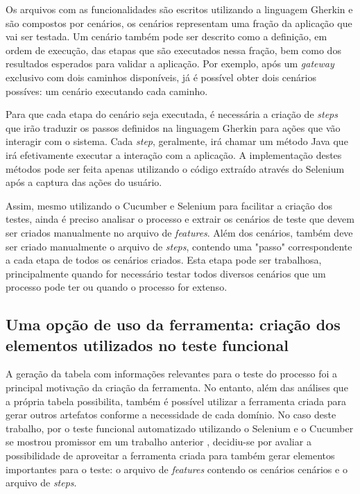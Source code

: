 \documentclass[12pt]{article}
\begin{document}
Os arquivos com as funcionalidades são escritos utilizando a linguagem Gherkin\cite{gherkin} e são compostos por cenários, os cenários representam uma fração da aplicação que vai ser testada. Um cenário também pode ser descrito como a definição, em ordem de execução, das etapas que são executados nessa fração, bem como dos resultados esperados para validar a aplicação. Por exemplo, após um \emph{gateway} exclusivo com dois caminhos disponíveis, já é possível obter dois cenários possíves: um cenário executando cada caminho.

Para que cada etapa do cenário seja executada, é necessária a criação de \emph{steps} que irão traduzir os passos definidos na linguagem Gherkin para ações que vão interagir com o sistema. Cada \emph{step}, geralmente, irá chamar um método Java que irá efetivamente executar a interação com a aplicação. A implementação destes métodos pode ser feita apenas utilizando o código extraído através do Selenium após a captura das ações do usuário.

Assim, mesmo utilizando o Cucumber e Selenium para facilitar a criação dos testes, ainda é preciso analisar o processo e extrair os cenários de teste que devem ser criados manualmente no arquivo de \emph{features}. Além dos cenários, também deve ser criado manualmente o arquivo de \emph{steps}, contendo uma "passo" correspondente a cada etapa de todos os cenários criados. Esta etapa pode ser trabalhosa, principalmente quando for necessário testar todos diversos cenários que um processo pode ter ou quando o processo for extenso.

\subsection{Uma opção de uso da ferramenta: criação dos elementos utilizados no teste funcional}
A geração da tabela com informações relevantes para o teste do processo foi a principal motivação da criação da ferramenta. No entanto, além das análises que a própria tabela possibilita, também é possível utilizar a ferramenta criada para gerar outros artefatos conforme a necessidade de cada domínio. No caso deste trabalho, por o teste funcional automatizado utilizando o Selenium e o Cucumber se mostrou promissor em um trabalho anterior \cite{sbqs2015}, decidiu-se por avaliar a possibilidade de aproveitar a ferramenta criada para também gerar elementos importantes para o teste: o arquivo de \emph{features} contendo os cenários cenários e o arquivo de \emph{steps}.
\end{document}

